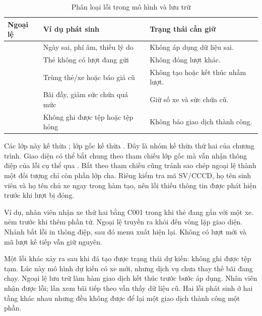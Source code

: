 \begin{table}[H]
\centering\small
\caption{Phân loại lỗi trong mô hình và lưu trữ}
\label{tab:exceptions}
\begin{tabularx}{\textwidth}{l Y Y}
\toprule
Ngoại lệ & Ví dụ phát sinh & Trạng thái cần giữ\\
\midrule
{} & Ngày sai, phí âm, thiếu lý do & Không áp dụng dữ liệu sai.\\
 & Thẻ không có lượt đang gửi & Không đóng lượt khác.\\
 & Trùng thẻ/xe hoặc báo giá cũ & Không tạo hoặc kết thúc nhầm lượt.\\
 & Bãi đầy, giảm sức chứa quá mức & Giữ số xe và sức chứa cũ.\\
 & Không ghi được tệp hoặc tệp hỏng & Không báo giao dịch thành công.\\
\bottomrule
\end{tabularx}
\end{table}

Các lớp này kế thừa ; lớp gốc kế thừa . Đây là nhóm kế thừa thứ hai của chương trình. Giao diện có thể bắt chung theo tham chiếu lớp gốc mà vẫn nhận thông điệp của lỗi cụ thể qua . Bắt theo tham chiếu cũng tránh sao chép ngoại lệ thành một đối tượng chỉ còn phần lớp cha. Riêng  kiểm tra mã SV/CCCD, họ tên sinh viên và họ tên chủ xe ngay trong hàm tạo, nên lỗi thiếu thông tin được phát hiện trước khi lượt bị đóng.


Ví dụ, nhân viên nhận xe thứ hai bằng C001 trong khi thẻ đang gắn với một xe.  ném  trước khi thêm phần tử. Ngoại lệ truyền ra khỏi  đến vòng lặp giao diện. Nhánh bắt lỗi in thông điệp, sau đó menu xuất hiện lại. Không có lượt mới và mã lượt kế tiếp vẫn giữ nguyên.

Một lỗi khác xảy ra sau khi đã tạo được trạng thái dự kiến: không ghi được tệp tạm. Lúc này mô hình dự kiến có xe mới, nhưng dịch vụ chưa thay thế bãi đang chạy. Ngoại lệ lưu trữ làm hàm giao dịch kết thúc trước bước áp dụng. Nhân viên nhận được lỗi; lần xem bãi tiếp theo vẫn thấy dữ liệu cũ. Hai lỗi phát sinh ở hai tầng khác nhau nhưng đều không được để lại một giao dịch thành công một phần.

